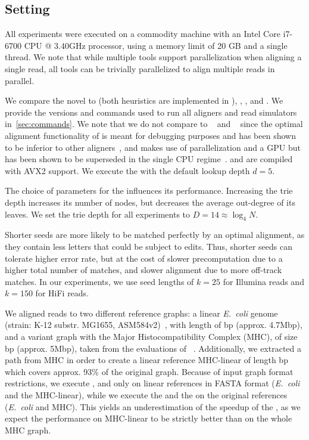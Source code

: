 \subsection{Setting}
%
All experiments were executed on a commodity machine with an Intel Core i7-6700
CPU @ 3.40GHz processor, using a memory limit of 20 GB and a single thread.
%
We note that while multiple tools support parallelization when aligning a single
read, all tools can be trivially parallelized to align multiple reads in
parallel.

%
We compare the novel \seedh to \prefixh (both heuristics are implemented in
\astarix), \graphaligner, \pasgal, and \vargas. We provide the versions and
commands used to run all aligners and read simulators in~\cref{sec:commands}. 
%
We note that we do not compare to \vg~\citep{garrison_variation_2018} and
\hga~\citep{feng2021accelerating} since the optimal alignment functionality of
\vg is meant for debugging purposes and has been shown to be inferior to other
aligners~\citep[Tab.~4]{feng2021accelerating}, and \hga makes use of
parallelization and a GPU but has been shown to be superseded in the single CPU
regime~\citep[Fig.~9]{feng2021accelerating}. \pasgal and \vargas are compiled
with AVX2 support. We execute the \prefixh with the default lookup depth $d=5$.

%
The choice of parameters for the \seedh influences its performance.
%
Increasing the trie depth increases its number of nodes, but decreases the
average out-degree of its leaves. We set the trie depth for all experiments to
$D=14 \approx \log_4 N$.

Shorter seeds are more likely to be matched perfectly by an optimal alignment,
as they contain less letters that could be subject to edits. Thus, shorter seeds
can tolerate higher error rate, but at the cost of slower precomputation due to
a higher total number of matches, and slower alignment due to more off-track
matches.
%
In our experiments, we use seed lengths of $k=25$ for Illumina reads and $k=150$
for HiFi reads.

%
We aligned reads to two different reference graphs: a linear \textit{E.~coli}
genome (strain: K-12 substr. MG1655, ASM584v2)~\citep{howe2019ensembl}, with
length of bp (approx. 4.7Mbp), and a variant graph with the
Major Histocompatibility Complex (MHC), of size bp (approx.
5Mbp), taken from the evaluations of \pasgal~\citep{jain_accelerating_2019}.
%
Additionally, we extracted a path from MHC in order to create a linear reference
MHC-linear of length bp which covers approx. 93\% of the
original graph. Because of input graph format restrictions, we execute
\graphaligner, \vargas and \pasgal only on linear references in FASTA format
(\textit{E.~coli} and the MHC-linear), while we execute the \seedh and the
\prefixh on the original references (\textit{E.~coli} and MHC). This yields an
underestimation of the speedup of the \seedh, as we expect the performance on
MHC-linear to be strictly better than on the whole MHC graph.

